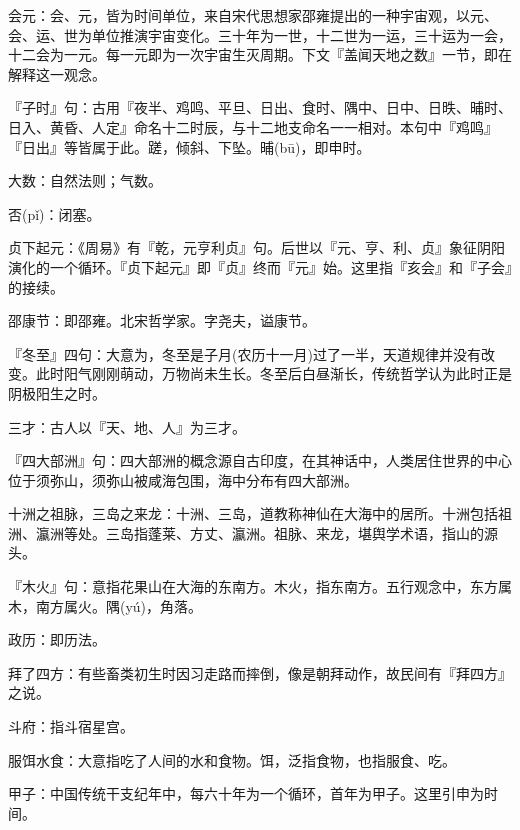 
\startbuffer[1]
会元：会、元，皆为时间单位，来自宋代思想家邵雍提出的一种宇宙观，以元、会、运、世为单位推演宇宙变化。三十年为一世，十二世为一运，三十运为一会，十二会为一元。每一元即为一次宇宙生灭周期。下文『盖闻天地之数』一节，即在解释这一观念。
\stopbuffer


\startbuffer[2]
『子时』句：古用『夜半、鸡鸣、平旦、日出、食时、隅中、日中、日昳、晡时、日入、黄昏、人定』命名十二时辰，与十二地支命名一一相对。本句中『鸡鸣』『日出』等皆属于此。蹉，倾斜、下坠。晡(bū)，即申时。
\stopbuffer


\startbuffer[3]
大数：自然法则；气数。
\stopbuffer


\startbuffer[4]
否(pǐ)：闭塞。
\stopbuffer


\startbuffer[5]
贞下起元：《周易》有『乾，元亨利贞』句。后世以『元、亨、利、贞』象征阴阳演化的一个循环。『贞下起元』即『贞』终而『元』始。这里指『亥会』和『子会』的接续。
\stopbuffer


\startbuffer[6]
邵康节：即邵雍。北宋哲学家。字尧夫，谥康节。
\stopbuffer


\startbuffer[7]
『冬至』四句：大意为，冬至是子月(农历十一月)过了一半，天道规律并没有改变。此时阳气刚刚萌动，万物尚未生长。冬至后白昼渐长，传统哲学认为此时正是阴极阳生之时。
\stopbuffer


\startbuffer[8]
三才：古人以『天、地、人』为三才。
\stopbuffer


\startbuffer[9]
『四大部洲』句：四大部洲的概念源自古印度，在其神话中，人类居住世界的中心位于须弥山，须弥山被咸海包围，海中分布有四大部洲。
\stopbuffer


\startbuffer[10]
十洲之祖脉，三岛之来龙：十洲、三岛，道教称神仙在大海中的居所。十洲包括祖洲、瀛洲等处。三岛指蓬莱、方丈、瀛洲。祖脉、来龙，堪舆学术语，指山的源头。
\stopbuffer


\startbuffer[11]
『木火』句：意指花果山在大海的东南方。木火，指东南方。五行观念中，东方属木，南方属火。隅(yú)，角落。
\stopbuffer


\startbuffer[12]
政历：即历法。
\stopbuffer


\startbuffer[13]
拜了四方：有些畜类初生时因习走路而摔倒，像是朝拜动作，故民间有『拜四方』之说。
\stopbuffer


\startbuffer[14]
斗府：指斗宿星宫。
\stopbuffer


\startbuffer[15]
服饵水食：大意指吃了人间的水和食物。饵，泛指食物，也指服食、吃。
\stopbuffer


\startbuffer[16]
甲子：中国传统干支纪年中，每六十年为一个循环，首年为甲子。这里引申为时间。
\stopbuffer


